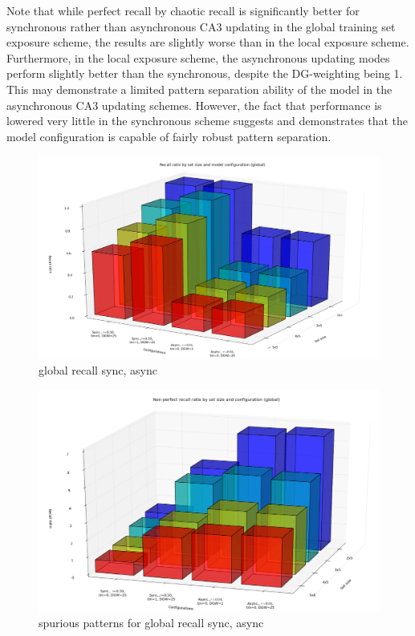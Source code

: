 Note that while perfect recall by chaotic recall is significantly better for synchronous rather than asynchronous CA3 updating in the global training set exposure scheme, the results are slightly worse than in the local exposure scheme. Furthermore, in the local exposure scheme, the asynchronous updating modes perform slightly better than the synchronous, despite the DG-weighting being 1. This may demonstrate a limited pattern separation ability of the model in the asynchronous CA3 updating schemes. However, the fact that performance is lowered very little in the synchronous scheme suggests and demonstrates that the model configuration is capable of fairly robust pattern separation.

\begin{figure}
    \centering
    \includegraphics[width=13cm]{fig/i-iters/global-recall}
    \caption{global recall sync, async}
    \label{fig:global-recall}
\end{figure}

\begin{figure}
    \centering
    \includegraphics[width=13cm]{fig/i-iters/global-recall-spurious}
    \caption{spurious patterns for global recall sync, async}
    \label{fig:global-recall-spurious}
\end{figure}

